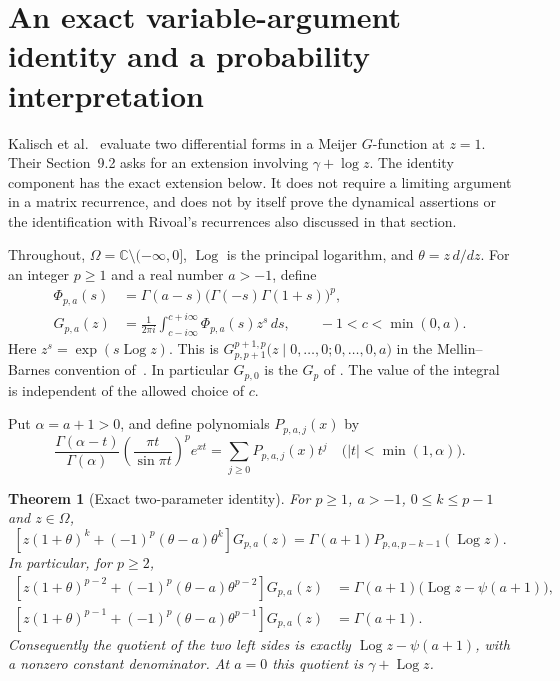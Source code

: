 \documentclass[11pt,a4paper]{article}
\newtheorem{theorem}{Theorem}[section]
\theoremstyle{definition}
\theoremstyle{remark}
\DeclareMathOperator{\Log}{Log}
\numberwithin{equation}{section}
\begin{document}
\section{An exact variable-argument identity and a probability interpretation}
\label{p3:sec:meijer-extension}

Kalisch et al.~\cite[Proposition~1]{p3:KMLWSK26} evaluate two differential
forms in a Meijer $G$-function at $z=1$. Their Section~9.2 asks for an
extension involving $\gamma+\log z$. The identity component has the exact
extension below. It does not require a limiting argument in a matrix
recurrence, and does not by itself prove the dynamical assertions or the
identification with Rivoal's recurrences also discussed in that section.

Throughout, $\Omega=\mathbb C\setminus(-\infty,0]$, $\Log$ is the principal
logarithm, and $\theta=z\,d/dz$. For an integer $p\ge1$ and a real number
$a>-1$, define
\begin{align}
 \Phi_{p,a}(s)&=\Gamma(a-s)
       \bigl(\Gamma(-s)\Gamma(1+s)\bigr)^p,\label{p3:eq:meijer-kernel-a}\\
 G_{p,a}(z)&=\frac1{2\pi i}\int_{c-i\infty}^{c+i\infty}
       \Phi_{p,a}(s)z^s\,ds,
       \qquad -1<c<\min(0,a).\label{p3:eq:meijer-G-a}
\end{align}
Here $z^s=\exp(s\Log z)$. This is
$G^{p+1,p}_{p,p+1}\bigl(z\mid 0,\ldots,0;
0,\ldots,0,a\bigr)$ in the Mellin--Barnes convention
of~\cite[\S16.17]{p3:DLMF}. In particular $G_{p,0}$ is the $G_p$ of
\cite{p3:KMLWSK26}. The value of the integral is independent of the allowed
choice of $c$.

Put $\alpha=a+1>0$, and define polynomials $P_{p,a,j}(x)$ by
\begin{equation}\label{p3:eq:meijer-P-generating}
 \frac{\Gamma(\alpha-t)}{\Gamma(\alpha)}
 \left(\frac{\pi t}{\sin\pi t}\right)^p e^{xt}
   =\sum_{j\ge0}P_{p,a,j}(x)t^j
 \quad\bigl(|t|<\min(1,\alpha)\bigr).
\end{equation}

\begin{theorem}[Exact two-parameter identity]\label{p3:thm:meijer-exact-extension}
For $p\ge1$, $a>-1$, $0\le k\le p-1$ and $z\in\Omega$,
\begin{equation}\label{p3:eq:meijer-exact-extension}
 \left[z(1+\theta)^k+(-1)^p(\theta-a)\theta^k\right]G_{p,a}(z)
   =\Gamma(a+1)P_{p,a,p-k-1}(\Log z).
\end{equation}
In particular, for $p\ge2$,
\begin{align}
 \left[z(1+\theta)^{p-2}
       +(-1)^p(\theta-a)\theta^{p-2}\right]G_{p,a}(z)
   &=\Gamma(a+1)\bigl(\Log z-\psi(a+1)\bigr),\label{p3:eq:meijer-digamma}\\
 \left[z(1+\theta)^{p-1}
       +(-1)^p(\theta-a)\theta^{p-1}\right]G_{p,a}(z)
   &=\Gamma(a+1).\label{p3:eq:meijer-unit}
\end{align}
Consequently the quotient of the two left sides is exactly
$\Log z-\psi(a+1)$, with a nonzero constant denominator.
At $a=0$ this quotient is $\gamma+\Log z$.
\end{theorem}
\end{document}
